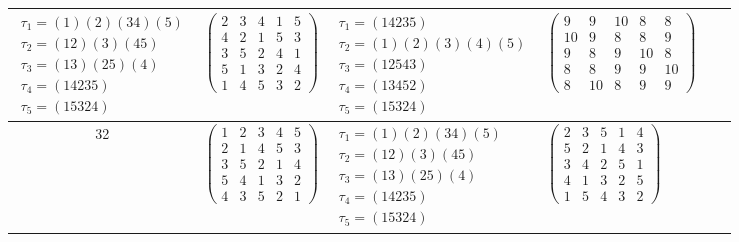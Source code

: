 \begin{longtable}{|c|p{2.7cm}|p{2.7cm}|p{2.7cm}|p{2.7cm}|p{3.3cm}|}
    $\begin{array}{l}\tau_{1}=(1)(2)(34)(5)\\ \tau_{2}=(12)(3)(45)\\ \tau_{3}=(13)(25)(4)\\ \tau_{4}=(14235)\\ \tau_{5}=(15324)\end{array}$     &
    $\begin{pmatrix}2&3&4&1&5\\4&2&1&5&3\\3&5&2&4&1\\5&1&3&2&4\\1&4&5&3&2\end{pmatrix}$                                                         &
    $\begin{array}{l}\tau_{1}=(14235)\\ \tau_{2}=(1)(2)(3)(4)(5)\\ \tau_{3}=(12543)\\ \tau_{4}=(13452)\\ \tau_{5}=(15324)\end{array}$           &
    $\begin{pmatrix}9&9&10&8&8\\10&9&8&8&9\\9&8&9&10&8\\8&8&9&9&10\\8&10&8&9&9\end{pmatrix}$                                                                                                                                \\
    \hline
    32                                                                                                                                          &
    $\begin{pmatrix}1&2&3&4&5\\2&1&4&5&3\\3&5&2&1&4\\5&4&1&3&2\\4&3&5&2&1\end{pmatrix}$                                                         &
    $\begin{array}{l}\tau_{1}=(1)(2)(34)(5)\\ \tau_{2}=(12)(3)(45)\\ \tau_{3}=(13)(25)(4)\\ \tau_{4}=(14235)\\ \tau_{5}=(15324)\end{array}$     &
    $\begin{pmatrix}2&3&5&1&4\\5&2&1&4&3\\3&4&2&5&1\\4&1&3&2&5\\1&5&4&3&2\end{pmatrix}$                                                         &

\end{longtable}
